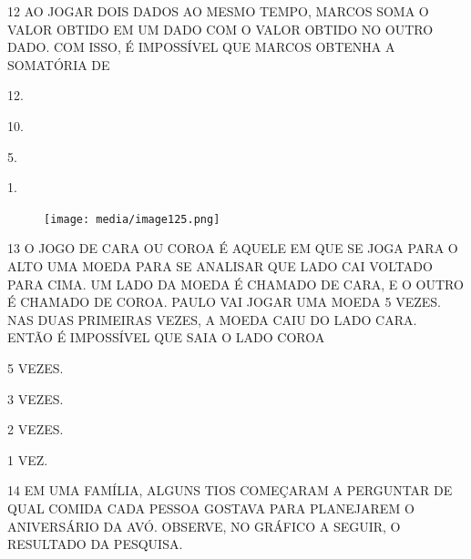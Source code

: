 \num{12} AO JOGAR DOIS DADOS AO MESMO TEMPO, MARCOS SOMA O VALOR OBTIDO EM UM DADO COM O VALOR OBTIDO NO OUTRO DADO.
COM ISSO, É IMPOSSÍVEL QUE MARCOS OBTENHA A SOMATÓRIA DE

\begin{multicols}{2}
\begin{escolha}[itemsep=0pt]
\item 12.

\item 10.

\item 5.

\item 1.
\end{escolha}
\end{multicols}

\begin{figure}[H]
\centering
\texttt{[image: media/image125.png]}
\end{figure}

\num{13} O JOGO DE CARA OU COROA É AQUELE EM QUE SE JOGA PARA O ALTO UMA MOEDA
PARA SE ANALISAR QUE LADO CAI VOLTADO PARA CIMA. UM LADO DA MOEDA É CHAMADO DE
CARA, E O OUTRO É CHAMADO DE COROA. PAULO VAI JOGAR UMA MOEDA 5 VEZES. NAS DUAS
PRIMEIRAS VEZES, A MOEDA CAIU DO LADO CARA. ENTÃO É IMPOSSÍVEL QUE SAIA O LADO
COROA

\begin{multicols}{2}
\begin{escolha}[itemsep=0pt]
\item 5 VEZES.

\item 3 VEZES.

\item 2 VEZES.

\item 1 VEZ.
\end{escolha}
\end{multicols}

\num{14} EM UMA FAMÍLIA, ALGUNS TIOS COMEÇARAM A PERGUNTAR DE QUAL COMIDA CADA
PESSOA GOSTAVA PARA PLANEJAREM O ANIVERSÁRIO DA AVÓ. OBSERVE, NO GRÁFICO A SEGUIR,
O RESULTADO DA PESQUISA.

